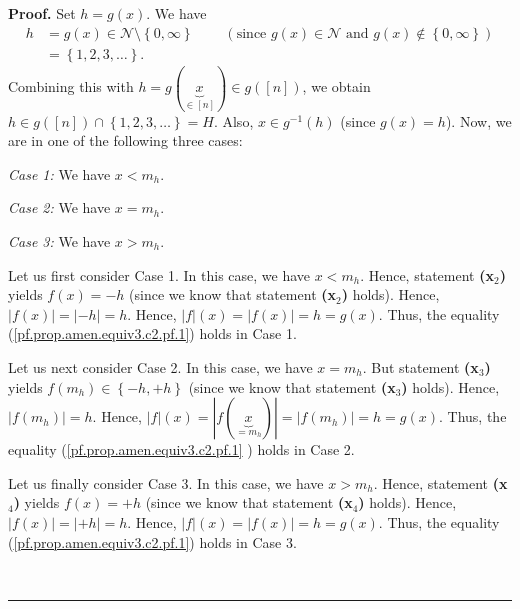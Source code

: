 \documentclass[numbers=enddot,12pt,final,onecolumn,notitlepage]{scrartcl}%
\theoremstyle{definition}
\newenvironment{proof}[1][Proof]{\noindent\textbf{#1.} }{\ \rule{0.5em}{0.5em}}
\newenvironment{verlong}{}{}
\begin{document}
\begin{verlong}
\begin{proof}
Set $h=g\left(  x\right)  $. We have
\begin{align*}
h  &  =g\left(  x\right)  \in\mathcal{N}\setminus\left\{  0,\infty\right\}
\ \ \ \ \ \ \ \ \ \ \left(  \text{since }g\left(  x\right)  \in\mathcal{N}%
\text{ and }g\left(  x\right)  \notin\left\{  0,\infty\right\}  \right) \\
&  =\left\{  1,2,3,\ldots\right\}  .
\end{align*}
Combining this with $h=g\left(  \underbrace{x}_{\in\left[  n\right]  }\right)
\in g\left(  \left[  n\right]  \right)  $, we obtain $h\in g\left(  \left[
n\right]  \right)  \cap\left\{  1,2,3,\ldots\right\}  =H$. Also, $x\in
g^{-1}\left(  h\right)  $ (since $g\left(  x\right)  =h$). Now, we are in one
of the following three cases:

\textit{Case 1:} We have $x<m_{h}$.

\textit{Case 2:} We have $x=m_{h}$.

\textit{Case 3:} We have $x>m_{h}$.

Let us first consider Case 1. In this case, we have $x<m_{h}$. Hence,
statement \textbf{(x}$_{2}$\textbf{)} yields $f\left(  x\right)  =-h$ (since
we know that statement \textbf{(x}$_{2}$\textbf{)} holds). Hence, $\left\vert
f\left(  x\right)  \right\vert =\left\vert -h\right\vert =h$. Hence,
$\left\vert f\right\vert \left(  x\right)  =\left\vert f\left(  x\right)
\right\vert =h=g\left(  x\right)  $. Thus, the equality
(\ref{pf.prop.amen.equiv3.c2.pf.1}) holds in Case 1.

Let us next consider Case 2. In this case, we have $x=m_{h}$. But statement
\textbf{(x}$_{3}$\textbf{)} yields $f\left(  m_{h}\right)  \in\left\{
-h,+h\right\}  $ (since we know that statement \textbf{(x}$_{3}$\textbf{)}
holds). Hence, $\left\vert f\left(  m_{h}\right)  \right\vert =h$. Hence,
$\left\vert f\right\vert \left(  x\right)  =\left\vert f\left(  \underbrace{x}%
_{=m_{h}}\right)  \right\vert =\left\vert f\left(  m_{h}\right)  \right\vert
=h=g\left(  x\right)  $. Thus, the equality (\ref{pf.prop.amen.equiv3.c2.pf.1}%
) holds in Case 2.

Let us finally consider Case 3. In this case, we have $x>m_{h}$. Hence,
statement \textbf{(x}$_{4}$\textbf{)} yields $f\left(  x\right)  =+h$ (since
we know that statement \textbf{(x}$_{4}$\textbf{)} holds). Hence, $\left\vert
f\left(  x\right)  \right\vert =\left\vert +h\right\vert =h$. Hence,
$\left\vert f\right\vert \left(  x\right)  =\left\vert f\left(  x\right)
\right\vert =h=g\left(  x\right)  $. Thus, the equality
(\ref{pf.prop.amen.equiv3.c2.pf.1}) holds in Case 3.


\end{proof}
\end{verlong}
\end{document}
